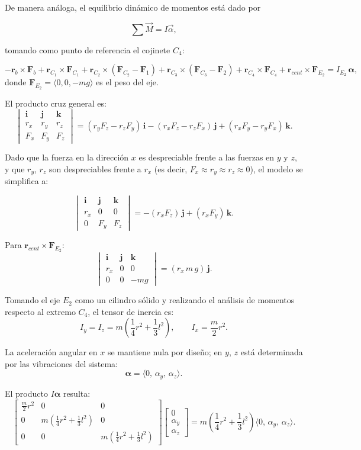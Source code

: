 De manera análoga, el equilibrio dinámico de momentos está dado por

\[
\sum \vec M = I\vec\alpha,
\]

tomando como punto de referencia el cojinete $C_4$:

\[
-\mathbf r_b\times\mathbf F_b
+\mathbf r_{C_1}\times\mathbf F_{C_1}
+\mathbf r_{C_2}\times(\mathbf F_{C_2}-\mathbf F_1)
+\mathbf r_{C_3}\times(\mathbf F_{C_3}-\mathbf F_2)
+\mathbf r_{C_4}\times\mathbf F_{C_4}
+\mathbf r_{cent}\times\mathbf F_{E_2}
= I_{E_2}\,\boldsymbol\alpha,
\]
donde $\mathbf F_{E_2}=\langle0,0,-m g\rangle$ es el peso del eje.

El producto cruz general es:
\[
\begin{vmatrix}
\mathbf i & \mathbf j & \mathbf k\\
r_x & r_y & r_z\\
F_x & F_y & F_z
\end{vmatrix}
=(r_yF_z-r_zF_y)\,\mathbf i-(r_xF_z-r_zF_x)\,\mathbf j+(r_xF_y-r_yF_x)\,\mathbf k.
\]

Dado que la fuerza en la dirección $x$ es despreciable frente a las fuerzas en $y$ y $z$, y que $r_y$, $r_z$ son despreciables
 frente a $r_x$ (es decir, $F_x\approx r_y\approx r_z\approx0$), el modelo se simplifica a:

\[
\begin{vmatrix}
\mathbf i & \mathbf j & \mathbf k\\
r_x & 0 & 0\\
0 & F_y & F_z
\end{vmatrix}
=-(r_xF_z)\,\mathbf j+(r_xF_y)\,\mathbf k.
\]

Para $\mathbf r_{cent}\times\mathbf F_{E_2}$:
\[
\begin{vmatrix}
\mathbf i & \mathbf j & \mathbf k\\
r_x & 0 & 0\\
0 & 0 & -m g
\end{vmatrix}
=(r_x\,m\,g)\,\mathbf j.
\]

Tomando el eje $E_2$ como un cilindro sólido y realizando el análisis de momentos respecto al extremo $C_4$, el tensor de 
inercia es:
\[
I_y=I_z=m\left(\frac14 r^2+\frac13 l^2\right),\qquad
I_x=\frac{m}{2}r^2.
\]

La aceleración angular en $x$ se mantiene nula por diseño; en $y$, $z$ está determinada por las vibraciones del sistema:
\[
\boldsymbol\alpha=\langle 0,\,\alpha_y,\,\alpha_z\rangle.
\]

El producto $I\boldsymbol\alpha$ resulta:
\[
\begin{bmatrix}
\frac{m}{2}r^2 & 0 & 0\\
0 & m\left(\frac14 r^2+\frac13 l^2\right) & 0\\
0 & 0 & m\left(\frac14 r^2+\frac13 l^2\right)
\end{bmatrix}
\begin{bmatrix}0\\ \alpha_y\\ \alpha_z\end{bmatrix}
= m\left(\frac14 r^2+\frac13 l^2\right)\langle0,\,\alpha_y,\,\alpha_z\rangle.
\]


